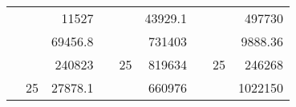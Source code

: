 \begin{table}[H]
\begin{tabular}{|ccrccrccc}
\rowcolor[HTML]{DAE8FC} 
\multicolumn{1}{|c|}{\cellcolor[HTML]{FFFFC7}}                                & \multicolumn{1}{c|}{\cellcolor[HTML]{DAE8FC}}                      & \multicolumn{1}{r|}{\cellcolor[HTML]{DAE8FC}11527}     & \multicolumn{1}{c|}{\cellcolor[HTML]{FFFFC7}}                                & \multicolumn{1}{c|}{\cellcolor[HTML]{DAE8FC}}                       & \multicolumn{1}{r|}{\cellcolor[HTML]{DAE8FC}43929.1}   & \multicolumn{1}{c|}{\cellcolor[HTML]{FFFFC7}}                                & \multicolumn{1}{c|}{\cellcolor[HTML]{DAE8FC}}                      & \multicolumn{1}{r|}{\cellcolor[HTML]{DAE8FC}497730}    \\ \cline{3-3} \cline{6-6} \cline{9-9} 
\multicolumn{1}{|c|}{\cellcolor[HTML]{FFFFC7}}                                & \multicolumn{1}{c|}{\cellcolor[HTML]{DAE8FC}}                      & \multicolumn{1}{r|}{\cellcolor[HTML]{DDFDFF}69456.8}   & \multicolumn{1}{c|}{\cellcolor[HTML]{FFFFC7}}                                & \multicolumn{1}{c|}{\cellcolor[HTML]{DAE8FC}}                       & \multicolumn{1}{r|}{\cellcolor[HTML]{DDFDFF}731403}    & \multicolumn{1}{c|}{\cellcolor[HTML]{FFFFC7}}                                & \multicolumn{1}{c|}{\cellcolor[HTML]{DAE8FC}}                      & \multicolumn{1}{r|}{\cellcolor[HTML]{DDFDFF}9888.36}   \\ \cline{3-3} \cline{6-6} \cline{9-9} 
\rowcolor[HTML]{DAE8FC} 
\multicolumn{1}{|c|}{\cellcolor[HTML]{FFFFC7}}                                & \multicolumn{1}{c|}{\cellcolor[HTML]{DAE8FC}}                      & \multicolumn{1}{r|}{\cellcolor[HTML]{DAE8FC}240823}    & \multicolumn{1}{c|}{\cellcolor[HTML]{FFFFC7}}                                & \multicolumn{1}{c|}{\multirow{-9}{*}{\cellcolor[HTML]{DAE8FC}25}}   & \multicolumn{1}{r|}{\cellcolor[HTML]{DAE8FC}819634}    & \multicolumn{1}{c|}{\cellcolor[HTML]{FFFFC7}}                                & \multicolumn{1}{c|}{\multirow{-9}{*}{\cellcolor[HTML]{DAE8FC}25}}  & \multicolumn{1}{r|}{\cellcolor[HTML]{DAE8FC}246268}    \\ \cline{3-3} \cline{5-6} \cline{8-9} 
\multicolumn{1}{|c|}{\cellcolor[HTML]{FFFFC7}}                                & \multicolumn{1}{c|}{\multirow{-10}{*}{\cellcolor[HTML]{DAE8FC}25}} & \multicolumn{1}{r|}{\cellcolor[HTML]{DDFDFF}27878.1}   & \multicolumn{1}{c|}{\cellcolor[HTML]{FFFFC7}}                                & \multicolumn{1}{c|}{\cellcolor[HTML]{DDFDFF}}                       & \multicolumn{1}{r|}{\cellcolor[HTML]{DAE8FC}660976}    & \multicolumn{1}{c|}{\cellcolor[HTML]{FFFFC7}}                                & \multicolumn{1}{c|}{\cellcolor[HTML]{DDFDFF}}                      & \multicolumn{1}{r|}{\cellcolor[HTML]{DAE8FC}1022150}   \\ \cline{2-3} \cline{6-6} \cline{9-9} 

\end{tabular}
\end{table}

